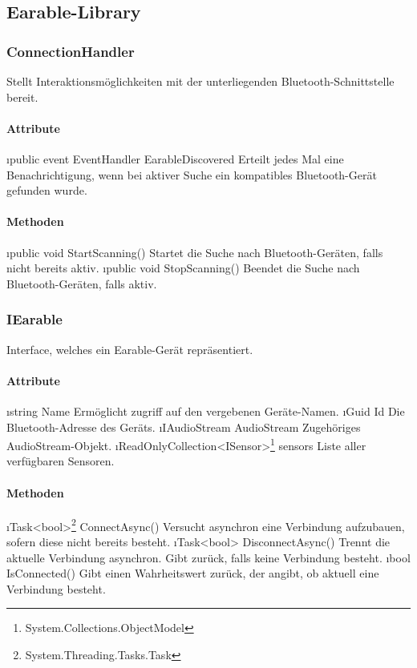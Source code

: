 \documentclass[../entwurf.tex]{subfiles}
\begin{document}
\subsection{Earable-Library}

\subsubsection{ConnectionHandler}
Stellt Interaktionsmöglichkeiten mit der unterliegenden Bluetooth-Schnittstelle bereit.
\paragraph{Attribute}
\begin{itemize}
	\i{public event EventHandler EarableDiscovered} Erteilt jedes Mal eine Benachrichtigung, wenn bei aktiver Suche ein kompatibles Bluetooth-Gerät gefunden wurde.\footnotemark[1]
\end{itemize}
\paragraph{Methoden}
\begin{itemize}
	\i{public void StartScanning()} Startet die Suche nach Bluetooth-Geräten, falls nicht bereits aktiv.
	\i{public void StopScanning()} Beendet die Suche nach Bluetooth-Geräten, falls aktiv.
\end{itemize}

\subsubsection{IEarable}
Interface, welches ein Earable-Gerät repräsentiert.
\paragraph{Attribute}
\begin{itemize}
	\i{string Name} Ermöglicht zugriff auf den vergebenen Geräte-Namen.
	\i{Guid Id} Die Bluetooth-Adresse des Geräts.
	\i{IAudioStream AudioStream} Zugehöriges AudioStream-Objekt.
	\i{ReadOnlyCollection<ISensor>\footnote{System.Collections.ObjectModel} sensors} Liste aller verfügbaren Sensoren.
\end{itemize}
\paragraph{Methoden}
\begin{itemize}
	\i{Task<bool>\footnote{System.Threading.Tasks.Task} ConnectAsync()} Versucht asynchron eine Verbindung aufzubauen, sofern diese nicht bereits besteht.
	\i{Task<bool> DisconnectAsync()} Trennt die aktuelle Verbindung asynchron. Gibt  zurück, falls keine Verbindung besteht.
	\i{bool IsConnected()} Gibt einen Wahrheitswert zurück, der angibt, ob aktuell eine Verbindung besteht.
\end{itemize}
\end{document}
